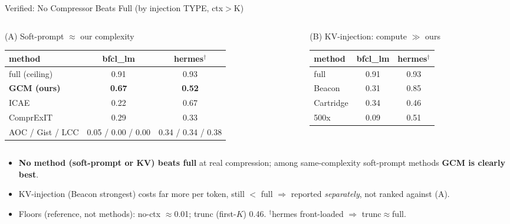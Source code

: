 \begin{frame}{Verified: No Compressor Beats Full (by injection TYPE, ctx$>$K)}
  \scriptsize
  \begin{columns}[T]
    \begin{column}{0.5\textwidth}
      \begin{block}{(A) Soft-prompt $\approx$ our complexity}
        \begin{tabular}{lcc}
          \toprule
          method & bfcl\_lm & hermes$^\dagger$ \\
          \midrule
          full (ceiling) & 0.91 & 0.93 \\
          \textbf{GCM (ours)} & \textbf{0.67} & \textbf{0.52} \\
          ICAE & 0.22 & 0.67 \\
          ComprExIT & 0.29 & 0.33 \\
          AOC / Gist / LCC & 0.05 / 0.00 / 0.00 & 0.34 / 0.34 / 0.38 \\
          \bottomrule
        \end{tabular}
      \end{block}
    \end{column}
    \begin{column}{0.5\textwidth}
      \begin{block}{(B) KV-injection: compute $\gg$ ours}
        \begin{tabular}{lcc}
          \toprule
          method & bfcl\_lm & hermes$^\dagger$ \\
          \midrule
          full & 0.91 & 0.93 \\
          Beacon & 0.31 & 0.85 \\
          Cartridge & 0.34 & 0.46 \\
          500x & 0.09 & 0.51 \\
          \bottomrule
        \end{tabular}
      \end{block}
    \end{column}
  \end{columns}
  \vspace{0.3em}
  \begin{itemize}
    \item \textbf{No method (soft-prompt or KV) beats full} at real compression; among same-complexity soft-prompt methods \textbf{GCM is clearly best}.
    \item KV-injection (Beacon strongest) costs far more per token, still $<$ full $\Rightarrow$ reported \emph{separately}, not ranked against (A).
    \item Floors (reference, not methods): no-ctx $\approx$0.01; trunc (first-$K$) 0.46. $^\dagger$hermes front-loaded $\Rightarrow$ trunc$\approx$full.
  \end{itemize}
\end{frame}

